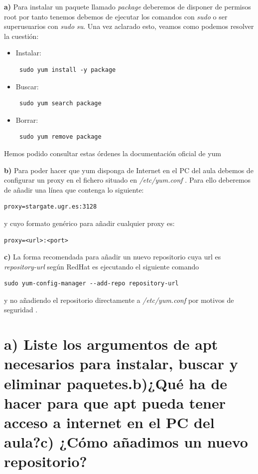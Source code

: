 \textbf{a)} Para instalar un paquete llamado \textit{package} deberemos de disponer de permisos root por tanto tenemos debemos de ejecutar los comandos con \textit{sudo} o ser superusuarios con \textit{sudo su}. Una vez aclarado esto, veamos como podemos resolver la cuestión:
\begin{itemize}
	\item Instalar: \begin{verbatim} sudo yum install -y package\end{verbatim}
	\item Buscar: \begin{verbatim} sudo yum search package\end{verbatim}
	\item Borrar: \begin{verbatim} sudo yum remove package\end{verbatim}
\end{itemize}

Hemos podido consultar estas órdenes la documentación oficial de yum \cite{man-yum}

\vspace{9mm}

\textbf{b) } Para poder hacer que yum disponga de Internet en el PC del aula debemos de configurar un proxy en el fichero situado en \textit{/etc/yum.conf} \cite{yum-proxy-conf}. Para ello deberemos de añadir una línea que contenga lo siguiente:\begin{verbatim}proxy=stargate.ugr.es:3128\end{verbatim} y cuyo formato genérico para añadir cualquier proxy es: \begin{verbatim}proxy=<url>:<port>\end{verbatim}

\vspace{9mm}

\textbf{c) } La forma recomendada para añadir un nuevo repositorio cuya url es \textit{repository-url} según RedHat es ejecutando el siguiente comando \begin{verbatim}sudo yum-config-manager --add-repo repository-url\end{verbatim} y no añadiendo el repositorio directamente a \textit{/etc/yum.conf} por motivos de seguridad \cite{yum-add-repo}.

\section{a) Liste los argumentos de apt necesarios para instalar, buscar y eliminar paquetes.\newline b)¿Qué ha de hacer para que apt pueda tener acceso a internet en el PC del aula?\newline c) ¿Cómo añadimos un nuevo repositorio?}

